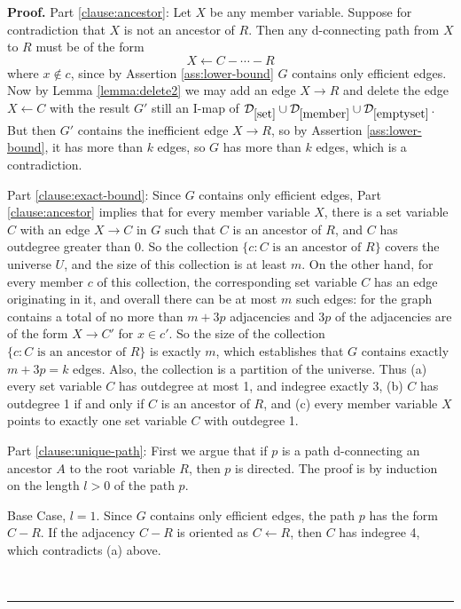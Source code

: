 \documentclass{elsarticle}%
\renewenvironment{proof}[1][Proof]{\noindent\textbf{#1.} }{\ \rule{0.5em}{0.5em}}
\newcommand{\A}{A}
\newcommand{\R}{R}
\newcommand{\X}{X}
\newcommand{\C}{C}
\newcommand{\G}{G}
\newcommand{\D}{\mathcal{D}}
\renewcommand{\c}{c}
\newcommand{\x}{x}
\begin{document}
 \begin{proof}
Part \ref{clause:ancestor}: Let $\X$ be any member variable. Suppose for contradiction that $\X$ is not an ancestor of $\R$. Then any d-connecting path from $\X$ to $\R$ must be of the form 
 $$\X \leftarrow \C-\cdots-\R$$ where $\x \not\in \c$, since by Assertion \ref{ass:lower-bound} $\G$ contains only efficient edges. Now by Lemma \ref{lemma:delete2} we may add an edge $\X \rightarrow \R$ and delete the edge $\X \leftarrow \C$ with the result $\G'$ still an I-map of $\D_{\ref{set}}\cup \D_{\ref{member}}\cup
\D_{\ref{emptyset}}$. But then $\G'$ contains the inefficient edge $\X \rightarrow \R$, so by Assertion \ref{ass:lower-bound}, it has more than $k$ edges, so $\G$ has more than $k$ edges, which is a contradiction.

Part \ref{clause:exact-bound}: Since $\G$ contains only efficient edges, Part \ref{clause:ancestor} implies that for every member variable $\X$, there is a set variable $\C$ with an edge $\X \rightarrow \C$ in $\G$ such that $\C$ is an ancestor of $\R$, and $\C$ has outdegree greater than 0. So the collection $\{\c: \C \mbox{ is an ancestor of $\R$}\}$ covers the universe $U$, and the size of this collection is at least $m$. On the other hand, for every member $\c$ of this collection, the corresponding set variable $\C$ has an edge originating in it, and overall there can be at most $m$ such edges: for the graph contains a total of no more than $m + 3p$ adjacencies and $3p$ of the adjacencies are of the form $\X \rightarrow \C'$ for $\x \in \c'$. So the size of the collection $\{\c: \C \mbox{ is an ancestor of $\R$}\}$  is exactly $m$, which establishes that $\G$ contains exactly $m + 3p = k$ edges. Also, the collection is a partition of the universe. Thus (a) every set variable $\C$ has outdegree at most 1, and indegree exactly 3, (b) $\C$ has outdegree 1 if and only if  $\C$ is an ancestor of $\R$, and (c) every member variable $\X$ points to exactly one set variable $\C$ with outdegree 1.

Part \ref{clause:unique-path}: 
First we argue that if $p$ is a path d-connecting an ancestor $\A$ to the root variable $\R$, then $p$ is directed. %
The proof is by induction on the length $l >0$ of the path $p$.

Base Case, $l=1$. Since $\G$ contains only efficient edges, the path $p$ has the form $\C - \R$. If the adjacency $\C - \R$ is oriented as $\C \leftarrow \R$, then $\C$ has indegree 4, which contradicts (a) above.


\end{proof}
\end{document}
